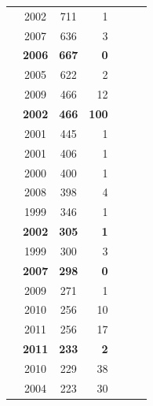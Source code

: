 \documentclass[sigconf,review]{acmart}
\newcommand{\cmark}{\ding{51}}%
\newcommand{\xmark}{\ding{55}}%
\begin{document}
\begin{table}
\begin{tabular}{r|@{~}c|@{~}c|@{~}r|@{~}c|@{~}c|@{~}c}
        \cite{1191795} & 2002 &	711	& 1 & \cmark & \cmark & \xmark \\
        \cite{Zimmermann:2007:PDE:1268984.1269057} & 2007 &	636	& 3 & \cmark & \cmark & \xmark \\
       \rowcolor{blue!10}  \textbf{\cite{boehm2006view}} & \textbf{2006} &	\textbf{667} & \textbf{0} & \xmark & \cmark & \xmark \\
        \cite{1435354} & 2005 &	622	& 2 & \cmark & \cmark & \xmark \\
        \cite{Zimmermann:2009:CDP:1595696.1595713} & 2009 &	466	& 12 & \cmark & \cmark & \xmark \\
       \rowcolor{blue!10}  \textbf{\cite{KrishnamurthyS}} & \textbf{2002} &	\textbf{466} & \textbf{100} & \xmark & \cmark & \xmark \\
        \cite{935855} & 2001 &	445	& 1 & \cmark & \xmark & \xmark \\
        \cite{ELEMAM200163} & 2001 &	406	& 1 & \cmark & \xmark & \xmark \\
        \cite{Cartwright} & 2000 &	400 &	1 & \cmark & \xmark & \xmark \\
        \cite{ELISH2008649} & 2008 &	398 &	4 & \cmark & \xmark & \xmark \\
        \cite{841025} & 1999 & 346 &	1 & \cmark & \xmark & \xmark \\
        \rowcolor{blue!10} \textbf{\cite{koch2002effort}} & \textbf{2002} &	\textbf{305} & \textbf{1} & \xmark & \cmark & \xmark \\
        \cite{809745} & 1999 & 300 &	3 & \cmark & \xmark & \xmark \\
        \rowcolor{blue!10} \textbf{\cite{4221622}} & \textbf{2007} &	\textbf{298} & \textbf{0} & \xmark & \cmark & \xmark \\
        \cite{5560680} & 2009 &	271 &	1 & \cmark & \cmark & \xmark \\
        \cite{Menzies2010} & 2010 &	256 &	10 & \cmark & \xmark & \xmark \\
        \cite{5611551} & 2011 &	256	& 17 & \cmark & \cmark & \xmark \\
        \rowcolor{blue!10} \textbf{\cite{Bird:2011:DTM:2025113.2025119}} & \textbf{2011} &	\textbf{233} &	\textbf{2} & \xmark & \cmark & \cmark \\
        \cite{Jureczko:2010:TIS:1868328.1868342} & 2010 &	229	& 38 & \cmark & \xmark & \xmark \\
        \cite{FENTON200732} & 2004 &	223 &	30 & \xmark & \cmark & \xmark \\

\end{tabular}
\end{table}
\end{document}
